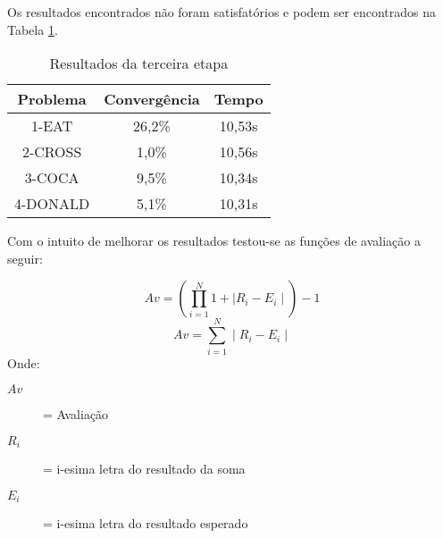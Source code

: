 \documentclass[a4paper, 12pt]{article}
\begin{document}
Os resultados encontrados não foram satisfatórios e podem ser encontrados na
Tabela \ref{tab:etapa3}.

  \begin{table}[h]
    \centering
    \begin{tabular}{|c|c|c|}
      \hline
      Problema & Convergência & Tempo \\
      \hline
      1-EAT & 26,2\% & 10,53s \\
      \hline
      2-CROSS & 1,0\% & 10,56s \\
      \hline
      3-COCA & 9,5\% & 10,34s \\
      \hline
      4-DONALD & 5,1\% & 10,31s \\
      \hline
    \end{tabular}
    \caption{Resultados da terceira etapa}
    \label{tab:etapa3}
  \end{table}

Com o intuito de melhorar os resultados testou-se as funções de avaliação a seguir:

  \begin{equation}
    Av = (\prod_{i=1}^{N} 1+\mid R_i - E_i\mid) -1
    \label{eq:avprod}
  \end{equation}
  \begin{equation}
    Av = \sum_{i=1}^{N} \mid R_i - E_i\mid
    \label{eq:avdifind}
  \end{equation}
Onde:
  \begin{description}
    \item[\(Av\)] = Avaliação
    \item[\(R_i\)] = i-esima letra do resultado da soma
    \item[\(E_i\)] = i-esima letra do resultado esperado
  \end{description}
\end{document}
